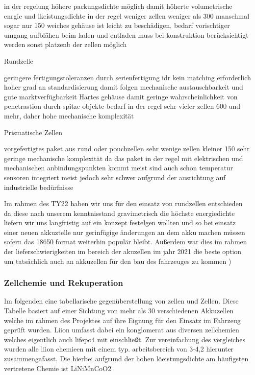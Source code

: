 in der regelung höhere packungsdichte möglich damit höherte volumetrische enrgie und lkeistungsdichte
in der regel weniger zellen weniger als 300 manschmal sogar nur 150
weiches gehäuse ist leicht zu beschädigen, bedarf vorischtiger umgang 
aufblähen beim laden und entladen muss bei konstruktion berücksichtigt werden sonst platzenb der zellen möglich


Rundzelle

geringere fertigungstoleranzen durch serienfertigung idr kein matching erforderlich
hoher grad an standardisierung damit folgen mechanische austauschbarkeit und gute marktverfügbarkeit
Hartes gehäuse damit geringe wahrscheinlichkeit von penetrastion durch spitze objekte
bedarf in der regel sehr vieler zellen 600 und mehr, daher hohe mechanische komplexität

Prismatische Zellen

vorgefertigtes paket aus rund oder pouchzellen
sehr wenige zellen kleiner 150
sehr geringe mechanische komplexität da das paket in der regel mit elektrischen und mechanischen anbindungspunkten kommt meist sind auch schon temperatur sensoren integriert
meist jedoch sehr schwer aufgrund der ausrichtung auf industrielle bedürfnisse


Im rahmen des TY22 haben wir uns für den einsatz von rundzellen entschieden da diese nach unserem kenntnisstand gravimetrisch die höchste energiedichte liefern wir uns langfristig auf ein konzept festelgen wollten und so bei einsatz einer neuen akkuztelle nur gerinfügige änderungen an dem akku machen müssen sofern das 18650 format weiterhin populär bleibt. Außerdem war dies im rahmen der lieferschwierigkeiten im bereich der akuzellen im jahr 2021 die beste option um tatsächlich auch an akkuzellen für den bau des fahrzeuges zu kommen
)
\FloatBarrier
\subsubsection{Zellchemie und Rekuperation}

Im folgenden eine tabellarische gegenüberstellung von  zellen und  Zellen. Diese Tabelle basiert auf einer Sichtung von mehr als 30 verschiedenen Akkuzellen welche im rahmen des Projektes auf ihre Eignung für den Einsatz im Fahrzeug geprüft wurden. Liion umfasst dabei ein konglomerat aus diversen zellchemien welches eigentlich auch lifepo4 mit einschließt. Zur vereinfachung des vergleiches wurden alle liion chemieen mit einem typ. arbeitsbereich von 3-4,2 hierunter zusammengafasst. Die hierbei aufgrund der hohen löeistungsdichte am häufigsten vertretene Chemie ist LiNiMnCoO2



